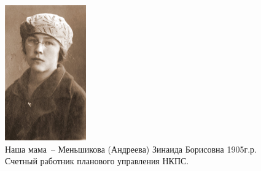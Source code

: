 \documentclass[utf8x, 12pt]{G7-32a} %
\begin{document}
\frontmatter %


\thispagestyle{empty} 

\begin{figure}[h!]
    \begin{minipage}[h!]{50mm}
         \begin{center}
         \vspace{-15pt}
         \includegraphics[width=35mm]{inc/Menshekovy/11.jpg} 
         \end{center}
         \caption{Наша мама~-- Меньшикова (Андреева) Зинаида Борисовна 1905г.р. Счетный работник планового управления НКПС.}
    \end{minipage}
    \hfill
   \begin{minipage}[h]{70mm}

\end{minipage}
\end{figure}
\end{document}
